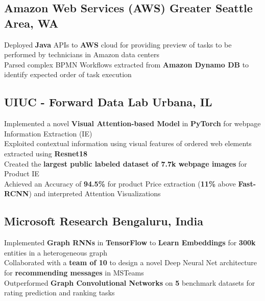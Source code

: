 \documentclass[]{Keval-resume}
\begin{document}
\subsection{Amazon Web Services (AWS) \hfill \normalfont G\lowercase{reater} S\lowercase{eattle} A\lowercase{rea}, WA}
\textbullet{} Deployed \textbf{Java} APIs to \textbf{AWS} cloud for providing preview of tasks to be performed by technicians in Amazon data centers \\
\textbullet{} Parsed complex BPMN Workflows extracted from \textbf{Amazon Dynamo DB} to identify expected order of task execution \\
\sectionsep

\subsection{UIUC - Forward Data Lab \hfill \normalfont U\lowercase{rbana}, IL}
\textbullet{} Implemented a novel \textbf{Visual Attention-based Model} in \textbf{PyTorch} for webpage Information Extraction (IE) \\
\textbullet{} Exploited contextual information using visual features of ordered web elements extracted using \textbf{Resnet18} \\  
\textbullet{} Created the \textbf{largest public labeled dataset of 7.7k webpage images} for Product IE \\
\textbullet{} Achieved an Accuracy of \textbf{94.5\%} for product Price extraction (\textbf{11\%} above \textbf{Fast-RCNN}) and interpreted Attention Visualizations
\sectionsep

\subsection{Microsoft Research \hfill \normalfont B\lowercase{engaluru}, I\lowercase{ndia}}
\textbullet{} Implemented \textbf{Graph RNNs} in \textbf{TensorFlow} to \textbf{Learn Embeddings} for \textbf{300k} entities in a heterogeneous graph \\
\textbullet{} Collaborated with a \textbf{team of 10} to design a novel Deep Neural Net architecture for \textbf{recommending messages} in MSTeams \\
\textbullet{} Outperformed \textbf{Graph Convolutional Networks} on \textbf{5} benchmark datasets for rating prediction and ranking tasks
\sectionsep
\end{document}
